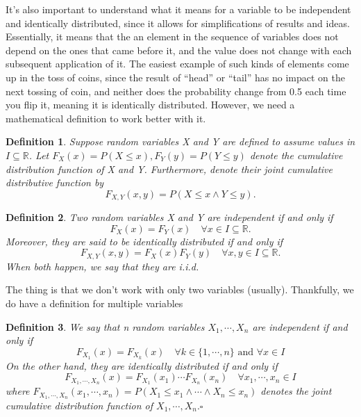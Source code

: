 \documentclass{article}
\newtheorem*{def*}{Definition}
\begin{document}
  It's also important to understand what it means for a variable to be independent and identically distributed, since it allows
for simplifications of results and ideas. Essentially, it means that the an element in the sequence of variables 
does not depend on the ones that came before it, and the value does not change with each subsequent application of it.
The easiest example of such kinds of elements come up in the toss of coins, since the result of ``head'' or ``tail''
has no impact on the next tossing of coin, and neither does the probability change from 0.5 each time you flip it,
meaning it is identically distributed. However, we need a mathematical definition to work better with it.
\begin{def*}
  Suppose random variables X and Y are defined to assume values in $I\subseteq{\mathbb{R}}$. Let $F_{X}(x) = P(X\leq{x}), 
F_{Y}(y) = P(Y\leq{y})$ denote the cumulative distribution function of X and Y. Furthermore, denote their joint cumulative
distributive function by
  $$
    F_{X, Y}(x, y) = P(X\leq{x}\wedge Y\leq{y}).
  $$
\end{def*}
 \begin{def*}
   Two random variables X and Y are independent if and only if
   $$
    F_{X}(x) = F_{Y}(x)\quad \forall x\in I\subseteq{\mathbb{R}}.
   $$
   Moreover, they are said to be identically distributed if and only if 
   $$
    F_{X, Y}(x, y)=F_{X}(x)F_{Y}(y)\quad \forall x, y\in I\subseteq{\mathbb{R}}.
   $$
   When both happen, we say that they are i.i.d.
 \end{def*}
  The thing is that we don't work with only two variables (usually). Thankfully, we do have a definition for multiple variables
 \begin{def*}
   We say that n random variables $X_{1},\cdots,X_{n}$ are independent if and only if 
   $$
   F_{X_{1}}(x) = F_{X_{k}}(x)\quad \forall k\in\{1,\cdots,n\}\text{ and }\forall x\in I
   $$
   On the other hand, they are identically distributed if and only if 
   $$
    F_{X_{1},\cdots,X_{n}}(x) = F_{X_{1}}(x_{1})\cdots F_{X_{n}}(x_{n})\quad \forall x_{1},\cdots,x_{n}\in I
   $$
 where $F_{X_{1},\cdots,X_{n}}(x_{1},\cdots,x_{n})=P(X_{1}\leq{x_{1}}\wedge\cdots\wedge X_{n}\leq{x_{n}})$ denotes the joint 
  cumulative distribution function of $X_{1},\cdots,X_{n}.\square$
 \end{def*}
\end{document}
